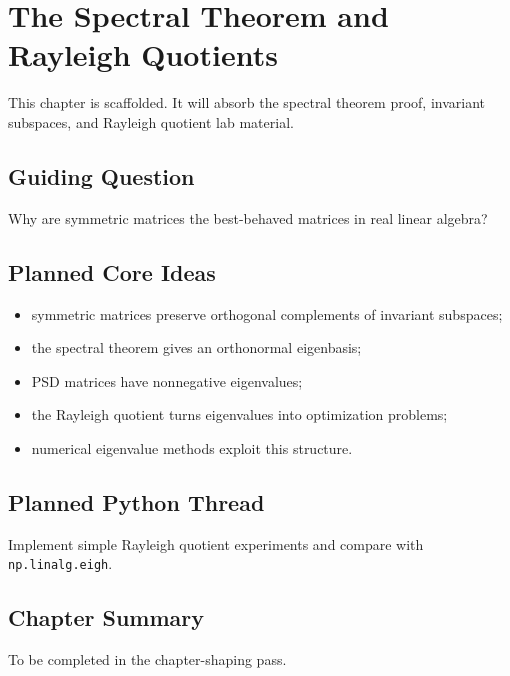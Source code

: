 \chapter{The Spectral Theorem and Rayleigh Quotients}
\label{ch:spectral-theorem-rayleigh}

\begin{draftbox}
This chapter is scaffolded. It will absorb the spectral theorem proof,
invariant subspaces, and Rayleigh quotient lab material.
\end{draftbox}

\section{Guiding Question}

Why are symmetric matrices the best-behaved matrices in real linear algebra?

\section{Planned Core Ideas}

\begin{itemize}
  \item symmetric matrices preserve orthogonal complements of invariant
    subspaces;
  \item the spectral theorem gives an orthonormal eigenbasis;
  \item PSD matrices have nonnegative eigenvalues;
  \item the Rayleigh quotient turns eigenvalues into optimization problems;
  \item numerical eigenvalue methods exploit this structure.
\end{itemize}

\section{Planned Python Thread}

Implement simple Rayleigh quotient experiments and compare with
\texttt{np.linalg.eigh}.

\section*{Chapter Summary}

To be completed in the chapter-shaping pass.


